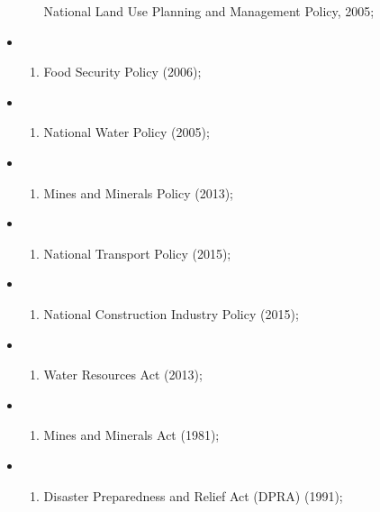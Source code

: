 \documentclass[
]{book}
\providecommand{\tightlist}{%
  \setlength{\itemsep}{0pt}\setlength{\parskip}{0pt}}
\begin{document}
\begin{itemize}
\begin{enumerate}
    National Land Use Planning and Management Policy, 2005;
  \end{enumerate}
\item
  \begin{enumerate}
  \def\labelenumi{\roman{enumi}.}
  \setcounter{enumi}{15}
  \tightlist
  \item
    Food Security Policy (2006);
  \end{enumerate}
\item
  \begin{enumerate}
  \def\labelenumi{\roman{enumi}.}
  \setcounter{enumi}{16}
  \tightlist
  \item
    National Water Policy (2005);
  \end{enumerate}
\item
  \begin{enumerate}
  \def\labelenumi{\roman{enumi}.}
  \setcounter{enumi}{17}
  \tightlist
  \item
    Mines and Minerals Policy (2013);
  \end{enumerate}
\item
  \begin{enumerate}
  \def\labelenumi{\roman{enumi}.}
  \setcounter{enumi}{18}
  \tightlist
  \item
    National Transport Policy (2015);
  \end{enumerate}
\item
  \begin{enumerate}
  \def\labelenumi{\roman{enumi}.}
  \setcounter{enumi}{19}
  \tightlist
  \item
    National Construction Industry Policy (2015);
  \end{enumerate}
\item
  \begin{enumerate}
  \def\labelenumi{\roman{enumi}.}
  \setcounter{enumi}{20}
  \tightlist
  \item
    Water Resources Act (2013);
  \end{enumerate}
\item
  \begin{enumerate}
  \def\labelenumi{\roman{enumi}.}
  \setcounter{enumi}{21}
  \tightlist
  \item
    Mines and Minerals Act (1981);
  \end{enumerate}
\item
  \begin{enumerate}
  \def\labelenumi{\roman{enumi}.}
  \setcounter{enumi}{22}
  \tightlist
  \item
    Disaster Preparedness and Relief Act (DPRA) (1991);

\end{enumerate}
\end{itemize}
\end{document}
